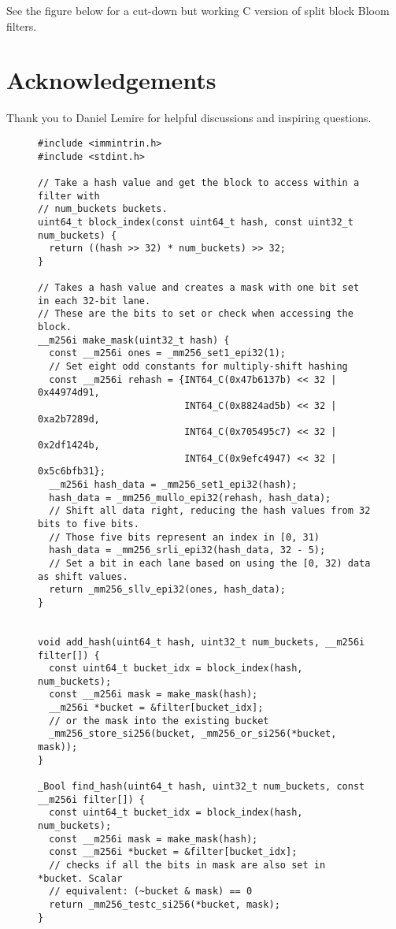 \documentclass[letterpaper, 11pt]{article}
\begin{document}
See the figure below for a cut-down but working C version of split block Bloom filters.

\section*{Acknowledgements}
Thank you to Daniel Lemire for helpful discussions and inspiring questions.




\appendix{}
\begin{figure}
  \begin{framed}
\begin{verbatim}
#include <immintrin.h>
#include <stdint.h>

// Take a hash value and get the block to access within a filter with
// num_buckets buckets.
uint64_t block_index(const uint64_t hash, const uint32_t num_buckets) {
  return ((hash >> 32) * num_buckets) >> 32;
}

// Takes a hash value and creates a mask with one bit set in each 32-bit lane.
// These are the bits to set or check when accessing the block.
__m256i make_mask(uint32_t hash) {
  const __m256i ones = _mm256_set1_epi32(1);
  // Set eight odd constants for multiply-shift hashing
  const __m256i rehash = {INT64_C(0x47b6137b) << 32 | 0x44974d91,
                          INT64_C(0x8824ad5b) << 32 | 0xa2b7289d,
                          INT64_C(0x705495c7) << 32 | 0x2df1424b,
                          INT64_C(0x9efc4947) << 32 | 0x5c6bfb31};
  __m256i hash_data = _mm256_set1_epi32(hash);
  hash_data = _mm256_mullo_epi32(rehash, hash_data);
  // Shift all data right, reducing the hash values from 32 bits to five bits.
  // Those five bits represent an index in [0, 31)
  hash_data = _mm256_srli_epi32(hash_data, 32 - 5);
  // Set a bit in each lane based on using the [0, 32) data as shift values.
  return _mm256_sllv_epi32(ones, hash_data);
}


void add_hash(uint64_t hash, uint32_t num_buckets, __m256i filter[]) {
  const uint64_t bucket_idx = block_index(hash, num_buckets);
  const __m256i mask = make_mask(hash);
  __m256i *bucket = &filter[bucket_idx];
  // or the mask into the existing bucket
  _mm256_store_si256(bucket, _mm256_or_si256(*bucket, mask));
}

_Bool find_hash(uint64_t hash, uint32_t num_buckets, const __m256i filter[]) {
  const uint64_t bucket_idx = block_index(hash, num_buckets);
  const __m256i mask = make_mask(hash);
  const __m256i *bucket = &filter[bucket_idx];
  // checks if all the bits in mask are also set in *bucket. Scalar
  // equivalent: (~bucket & mask) == 0
  return _mm256_testc_si256(*bucket, mask);
}
\end{verbatim}
  \end{framed}
\end{figure}
\end{document}
